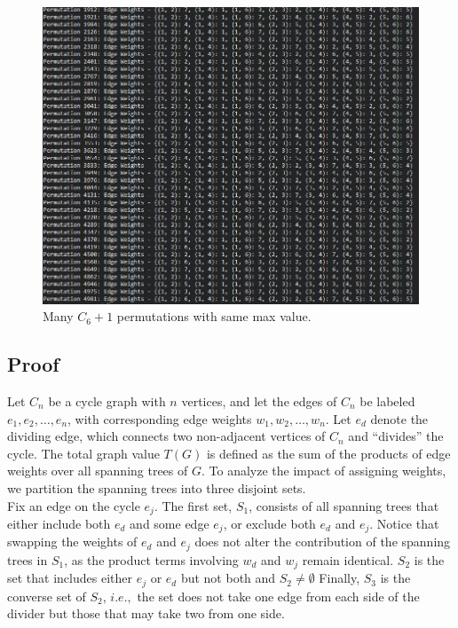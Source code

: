 \documentclass[12pt,letterpaper]{article}
\begin{document}
\begin{figure}[hbt!]  
    \begin{center}
    \includegraphics[width=5in]{f3.11.jpg}
    \caption{\label{Marble2} Many $C_6 + 1$ permutations with same max value.}
    \end{center}
	\end{figure}
\newpage
\subsection{Proof}

Let \( C_n \) be a cycle graph with \( n \) vertices, and let the edges of \( C_n \) be labeled \( e_1, e_2, \dots, e_n \), with corresponding edge weights \( w_1, w_2, \dots, w_n \). Let \( e_d \) denote the dividing edge, which connects two non-adjacent vertices of \( C_n \) and ``divides'' the cycle. The total graph value \( T(G) \) is defined as the sum of the products of edge weights over all spanning trees of \( G \). To analyze the impact of assigning weights, we partition the spanning trees into three disjoint sets.\\

Fix an edge on the cycle $e_{j}$. The first set, \( S_1 \), consists of all spanning trees that either include both \( e_d \) and some edge \( e_j \), or exclude both \( e_d \) and \( e_j \). Notice that swapping the weights of \( e_d \) and \( e_j \) does not alter the contribution of the spanning trees in \( S_1 \), as the product terms involving \( w_d \) and \( w_j \) remain identical. \( S_2 \) is the set that includes either \( e_j \) or \( e_d \) but not both and \( S_2 \neq \emptyset \) Finally, \( S_3 \) is the converse set of \( S_2 \), $i.e.,$ the set does not take one edge from each side of the divider but those that may take two from one side. \\
\end{document}

